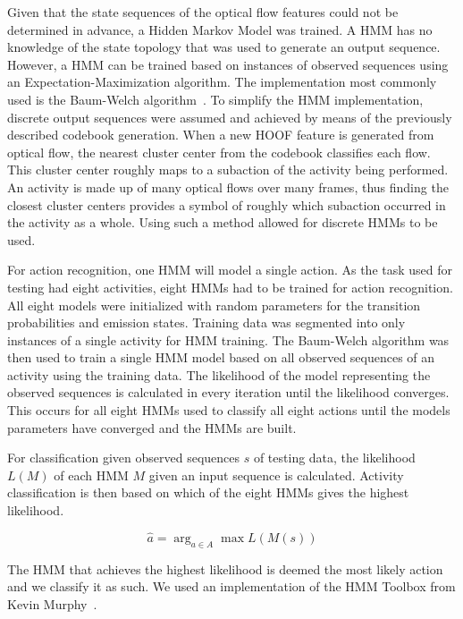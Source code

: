 \documentclass[10pt,twocolumn,letterpaper]{article}
\begin{document}
Given that the state sequences of the optical flow features could not be determined in advance, a Hidden Markov Model was trained. A HMM has no knowledge of the state topology that was used to generate an output sequence. However, a HMM can be trained based on instances of observed sequences using an Expectation-Maximization algorithm. The implementation most commonly used is the Baum-Welch algorithm~\cite{welch2003hidden}. To simplify the HMM implementation, discrete output sequences were assumed and achieved by means of the previously described codebook generation. When a new HOOF feature is generated from optical flow, the nearest cluster center from the codebook classifies each flow. This cluster center roughly maps to a subaction of the activity being performed. An activity is made up of many optical flows over many frames, thus finding the closest cluster centers provides a symbol of roughly which subaction occurred in the activity as a whole. Using such a method allowed for discrete HMMs to be used.

For action recognition, one HMM will model a single action. As the task used for testing had eight activities, eight HMMs had to be trained for action recognition. All eight models were initialized with random parameters for the transition probabilities and emission states. Training data was segmented into only instances of a single activity for HMM training. The Baum-Welch algorithm was then used to train a single HMM model based on all observed sequences of an activity using the training data. The likelihood of the model representing the observed sequences is calculated in every iteration until the likelihood converges. This occurs for all eight HMMs used to classify all eight actions until the models parameters have converged and the HMMs are built.

For classification given observed sequences $s$ of testing data, the likelihood $L(M)$ of each HMM $M$ given an input sequence is calculated. Activity classification is then based on which of the eight HMMs gives the highest likelihood.

\begin{equation}
\hat a = \arg_{a\in A}\max L(M(s))
\end{equation}

The HMM that achieves the highest likelihood is deemed the most likely action and we classify it as such. We used an implementation of the HMM Toolbox from Kevin Murphy~\cite{murphyHMM}.

\end{document}
